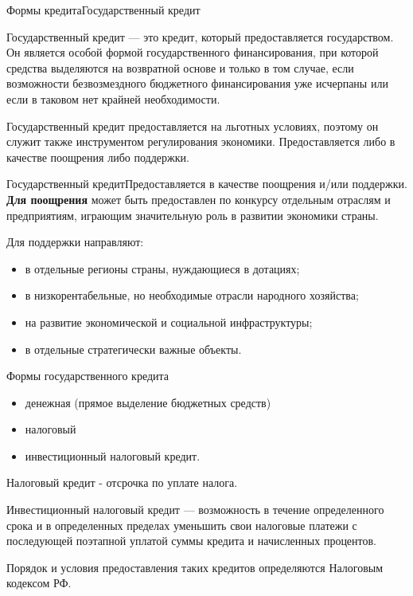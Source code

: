 \documentclass[_DKB_p2_Credit.tex]{subfiles}
\begin{document}
\begin{frame}{Формы кредита}{Государственный кредит}
\begin{block}{Государственный кредит}
\quad
— это кредит, который предоставляется государством. Он является особой формой государственного финансирования, при которой средства выделяются на возвратной основе и только в том случае, если возможности безвозмездного бюджетного финансирования уже исчерпаны или если в таковом нет крайней необходимости. 
\end{block}
\end{frame}

\begin{frame}
Государственный кредит предоставляется на льготных условиях, поэтому он служит также инструментом регулирования экономики. Предоставляется либо в качестве поощрения либо поддержки.
\end{frame}

\begin{frame}{Государственный кредит}{Предоставляется в качестве поощрения и/или поддержки.}
\textbf{Для поощрения }может быть предоставлен по конкурсу отдельным отраслям и предприятиям, играющим значительную роль в развитии экономики страны.

Для поддержки направляют:
\begin{itemize}
\item
в отдельные регионы страны, нуждающиеся в дотациях;
\item
в низкорентабельные, но необходимые отрасли народного хозяйства;
\item
на развитие экономической и социальной инфраструктуры;
\item
в отдельные стратегически важные объекты.
\end{itemize}

\end{frame}

\begin{frame}{Формы государственного кредита}
\begin{itemize}
\item
денежная (прямое выделение бюджетных средств)
\item
налоговый
\item
инвестиционный налоговый кредит. 
\end{itemize}
\end{frame}
\begin{frame}
\begin{block}{Налоговый кредит }
\quad 
- отсрочка по уплате налога.
\end{block}
\begin{block}{Инвестиционный налоговый кредит}
\quad
— возможность в течение определенного срока и в определенных пределах уменьшить свои налоговые платежи с последующей поэтапной уплатой суммы кредита и начисленных процентов.
\end{block}
Порядок и условия предоставления таких кредитов определяются Налоговым кодексом РФ.
\end{frame}
\end{document}
